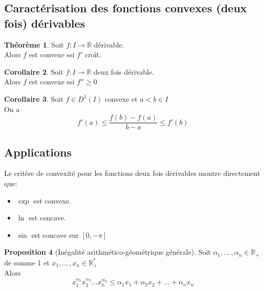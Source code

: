 \documentclass[10pt,a4paper]{article}
\theoremstyle{definition}
\newtheorem{proposition}{Proposition}[section]
\newtheorem{theorem}[proposition]{Théorème}
\newtheorem{corollaire}[proposition]{Corollaire}
\begin{document}
\subsection{Caractérisation des fonctions convexes (deux fois) dérivables}
\begin{theorem}
Soit $f: I \to \mathbb{R}$ dérivable. \\
Alors $f$ est convexe ssi $f'$ croît.
\end{theorem}
\begin{corollaire}
Soit $f: I \to \mathbb{R}$ deux fois dérivable. \\
Alors $f$ est convexe ssi $f'' \geq 0$
\end{corollaire}
\begin{corollaire}
Soit $f \in D^1(I)$ convexe et $a < b \in I$ \\
On a
\[ f'(a) \leq \frac{f(b) - f(a)}{b - a} \leq f'(b) \]
\end{corollaire}

\pagebreak

\subsection{Applications}
Le critère de convexité pour les fonctions deux fois dérivables montre directement que:
\begin{itemize}
\item $\exp$ est convexe.
\item $\ln$ est concave.
\item $\sin$ est concave sur $[0, - \pi]$
\end{itemize}
\begin{proposition}[Inégalité arithmético-géométrique générale]
Soit $\alpha_1, ...\, , \alpha_n \in \mathbb{R}_+$ de somme 1 et $\left.x_1, ...\, , x_n \in \mathbb{R}_+^*\right.$ \\
Alors
\[x_1^{\alpha_1} x_2^{\alpha_2} ... x_n^{\alpha_n} \leq \alpha_1 x_1 + \alpha_2 x_2 + ... + \alpha_n x_n\]
\end{proposition}
\end{document}
